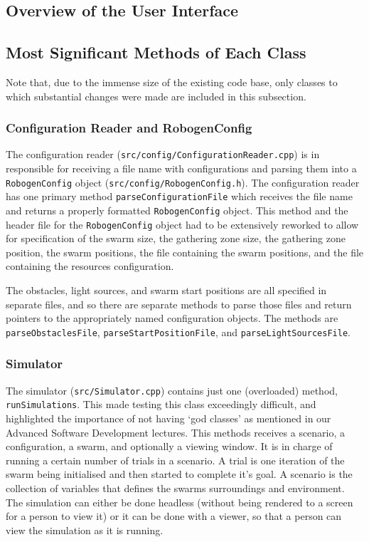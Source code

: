 \documentclass[11pt,a4paper]{article}
\begin{document}
\subsection{Overview of the User Interface}
\subsection{Most Significant Methods of Each Class}
Note that, due to the immense size of the existing code base, only classes
to which substantial changes were made are included in this subsection.

\subsubsection{Configuration Reader and RobogenConfig}
The configuration reader (\texttt{src/config/ConfigurationReader.cpp}) is in
responsible for receiving a file name with configurations and parsing them into
a \texttt{RobogenConfig} object (\texttt{src/config/RobogenConfig.h}). The
configuration reader has one primary method \texttt{parseConfigurationFile}
which receives the file name and returns a properly formatted
\texttt{RobogenConfig} object. This method and the header file for the
\texttt{RobogenConfig} object had to be extensively reworked to allow for
specification of the swarm size, the gathering zone size, the gathering zone
position, the swarm positions, the file containing the swarm positions, and the
file containing the resources configuration.

The obstacles, light sources, and swarm start positions are all specified in
separate files, and so there are separate methods to parse those files and
return pointers to the appropriately named configuration objects. The methods
are \texttt{parseObstaclesFile}, \texttt{parseStartPositionFile}, and
\texttt{parseLightSourcesFile}.

\subsubsection{Simulator}
The simulator (\texttt{src/Simulator.cpp}) contains just one (overloaded)
method, \texttt{runSimulations}. This made testing this class exceedingly
difficult, and highlighted the importance of not having `god classes' as
mentioned in our Advanced Software Development lectures. This methods receives a
scenario, a configuration, a swarm, and optionally a viewing window. It is in
charge of running a certain number of trials in a scenario. A trial is one
iteration of the swarm being initialised and then started to complete it's
goal. A scenario is the collection of variables that defines the swarms
surroundings and environment. The simulation can either be done headless
(without being rendered to a screen for a person to view it) or it can be done
with a viewer, so that a person can view the simulation as it is running.
\end{document}
